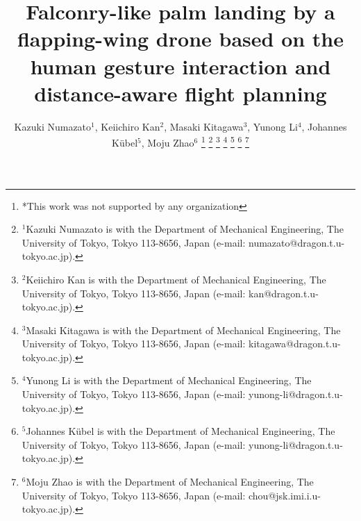 \documentclass[letterpaper, 10 pt, conference]{ieeeconf}  %
\title{\LARGE \bf
Falconry-like palm landing by a flapping-wing drone based on the human gesture interaction and distance-aware flight planning
}
\author{Kazuki Numazato$^{1}$, Keiichiro Kan$^{2}$, Masaki Kitagawa$^{3}$, Yunong Li$^{4}$, Johannes Kübel$^{5}$, Moju Zhao$^{6}$ %
\thanks{*This work was not supported by any organization}%
\thanks{$^{1}$Kazuki Numazato is with the Department of Mechanical Engineering, The University
        of Tokyo, Tokyo 113-8656, Japan (e-mail: numazato@dragon.t.u-tokyo.ac.jp).}%
\thanks{$^{2}$Keiichiro Kan is with the Department of Mechanical Engineering, The University
        of Tokyo, Tokyo 113-8656, Japan (e-mail: kan@dragon.t.u-tokyo.ac.jp).}%
\thanks{$^{3}$Masaki Kitagawa is with the Department of Mechanical Engineering, The University
        of Tokyo, Tokyo 113-8656, Japan (e-mail: kitagawa@dragon.t.u-tokyo.ac.jp).}%
\thanks{$^{4}$Yunong Li is with the Department of Mechanical Engineering, The University
        of Tokyo, Tokyo 113-8656, Japan (e-mail: yunong-li@dragon.t.u-tokyo.ac.jp).}%
\thanks{$^{5}$Johannes Kübel is with the Department of Mechanical Engineering, The University
        of Tokyo, Tokyo 113-8656, Japan (e-mail: yunong-li@dragon.t.u-tokyo.ac.jp).}%
\thanks{$^{6}$Moju Zhao is with the Department of Mechanical Engineering, The University
        of Tokyo, Tokyo 113-8656, Japan (e-mail: chou@jsk.imi.i.u-tokyo.ac.jp).}%
}
\begin{document}
\maketitle
\thispagestyle{empty}
\pagestyle{empty}

\begin{abstract}

\end{abstract}








\addtolength{\textheight}{-12cm}   %



\end{document}
